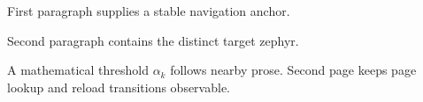 \documentclass{article}
\begin{document}
First paragraph supplies a stable navigation anchor.

Second paragraph contains the distinct target zephyr.

A mathematical threshold \(\alpha_k\) follows nearby prose.
\newpage
Second page keeps page lookup and reload transitions observable.
\end{document}
